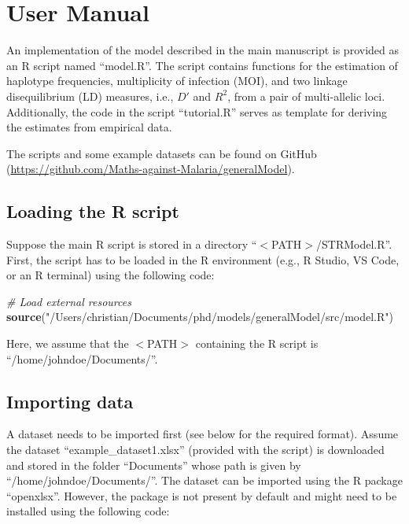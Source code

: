 \documentclass[
]{article}
\author{}
\date{\vspace{-2.5em}}
\newenvironment{Shaded}{\begin{snugshade}}{\end{snugshade}}
\newcommand{\CommentTok}[1]{\textcolor[rgb]{0.56,0.35,0.01}{\textit{#1}}}
\newcommand{\FunctionTok}[1]{\textcolor[rgb]{0.13,0.29,0.53}{\textbf{#1}}}
\newcommand{\NormalTok}[1]{#1}
\newcommand{\StringTok}[1]{\textcolor[rgb]{0.31,0.60,0.02}{#1}}
\begin{document}
\section*{User Manual}

\label{Usermanual:usermanual}

An implementation of the model described in the main manuscript is
provided as an R script named ``model.R''. The script contains functions
for the estimation of haplotype frequencies, multiplicity of infection
(MOI), and two linkage disequilibrium (LD) measures, i.e., \(D'\) and
\(R^2\), from a pair of multi-allelic loci. Additionally, the code in
the script ``tutorial.R'' serves as template for deriving the estimates
from empirical data.

The scripts and some example datasets can be found on GitHub
(\url{https://github.com/Maths-against-Malaria/generalModel}).

\subsection*{Loading the R script}

Suppose the main R script is stored in a directory
``\(<\)PATH\(>\)/STRModel.R''. First, the script has to be loaded in the
R environment (e.g., R Studio, VS Code, or an R terminal) using the
following code:

\begin{Shaded}
\begin{Highlighting}[]
\CommentTok{\# Load external resources}
    \FunctionTok{source}\NormalTok{(}\StringTok{"/Users/christian/Documents/phd/models/generalModel/src/model.R"}\NormalTok{)}
\end{Highlighting}
\end{Shaded}

Here, we assume that the \(<\)PATH\(>\) containing the R script is
``/home/johndoe/Documents/''.

\subsection*{Importing data}

A dataset needs to be imported first (see below for the required
format). Assume the dataset ``example\_dataset1.xlsx'' (provided with
the script) is downloaded and stored in the folder ``Documents'' whose
path is given by ``/home/johndoe/Documents/''. The dataset can be
imported using the R package ``openxlsx''. However, the package is not
present by default and might need to be installed using the following
code:
\end{document}
